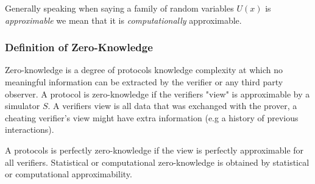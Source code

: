 \bigskip

Generally speaking when saying a family of random variables $U(x)$ is \textit{approximable} we mean that it is \textit{computationally} approximable.

\subsubsection{Definition of Zero-Knowledge}

Zero-knowledge is a degree of protocols knowledge complexity at which no meaningful information can be extracted by the verifier or any third party observer.
\bigskip
\newline
A protocol is zero-knowledge if the verifiers "view" is approximable by a simulator $S$.
A verifiers view is all data that was exchanged with the prover, a cheating verifier's view might have extra information (e.g a history of previous interactions).

A protocols is perfectly zero-knowledge if the view is perfectly approximable for all verifiers.
Statistical or computational zero-knowledge is obtained by statistical or computational approximability.